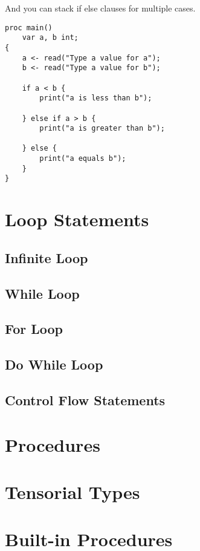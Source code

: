 \newpage

\noindent
And you can stack if else clauses for multiple cases.

\begin{verbatim}
proc main()
    var a, b int;
{
    a <- read("Type a value for a");
    b <- read("Type a value for b");

    if a < b {
        print("a is less than b");

    } else if a > b {
        print("a is greater than b");

    } else {
        print("a equals b");
    }
}
\end{verbatim}

\section{Loop Statements}
\subsection{Infinite Loop}
\subsection{While Loop}
\subsection{For Loop}
\subsection{Do While Loop}
\subsection{Control Flow Statements}

\section{Procedures}

\section{Tensorial Types}

\section{Built-in Procedures}
